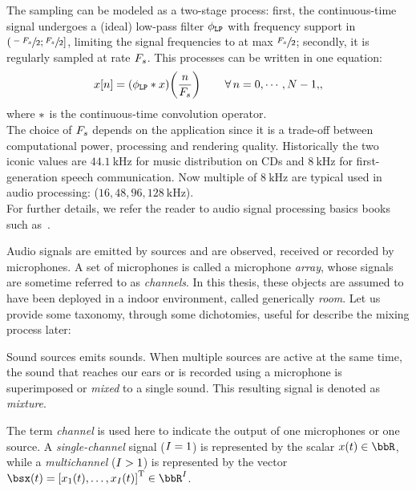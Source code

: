 The sampling can be modeled as a two-stage process:
first, the continuous-time signal undergoes a (ideal) low-pass filter $\phi_\mathtt{LP}$ with frequency support in $\kintervoc{\sfrac{-\Fs}{2}}{\sfrac{\Fs}{2}}$, limiting the signal frequencies to at max $\sfrac{F_s}{2}$;
secondly, it is regularly sampled at rate $F_s$.
This processes can be written in one equation:
\begin{equation}
    x[n] = (\lowpassfilter \conv x)\kparen{\frac{n}{\Fs}}
    \mathspace
    \kforall[n = 0, \cdots, N-1]
    ,
\end{equation}
where $\ast$ is the continuous-time convolution operator.
\\The choice of $F_s$ depends on the application since it is a trade-off between computational power, processing and rendering quality.
Historically the two iconic values are $\SI{44.1}{\kHz}$ for music distribution on CDs and $\SI{8}{\kHz}$ for first-generation speech communication.
Now multiple of $\SI{8}{\kHz}$ are typical used in audio processing: ($16, 48, 96, \SI{128}{\kHz}$).
\\For further details, we refer the reader to audio signal processing basics books such as~.

\mynewline
Audio signals are emitted by sources and are observed, received or recorded by microphones.
A set of microphones is called a microphone \textit{array}, whose signals are sometime referred to as \textit{channels}.
In this thesis, these objects are assumed to have been deployed in a indoor environment, called generically \textit{room}.
Let us provide some taxonomy, through some dichotomies, useful for describe the mixing process later:

Sound sources emits sounds.
When multiple sources are active at the same time, the sound that reaches our ears or is recorded using a microphone is superimposed or \textit{mixed} to a single sound.
This resulting signal is denoted as \textit{mixture}.

The term \textit{channel} is used here to indicate the output of one microphones or one source.
A \textit{single-channel} signal ($I = 1$) is represented by the scalar $\mic(t) \in \R$,
while a \textit{multichannel} ($I >   1$) is represented by the vector $\mics(t) = \ktranspose{\klist{\mic_1(t), \dots, \mic_{\numMics}(t)}} \in \R^{\numMics}$.

